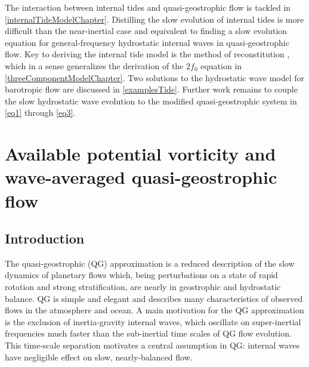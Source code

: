 \documentclass[12pt, oneside]{book}
\begin{document}
The interaction between internal tides and quasi-geostrophic flow is tackled in \ch \ref{internalTideModelChapter}.  Distilling the slow evolution of internal tides is more difficult than the near-inertial case and equivalent to finding a slow evolution equation for general-frequency hydrostatic internal waves in quasi-geostrophic flow.  Key to deriving the internal tide model is the method of reconstitution \citep{roberts1985introduction}, which in a sense generalizes the derivation of the $2f_0$ equation in \ch \ref{threeComponentModelChapter}.  Two solutions to the hydrostatic wave model for barotropic flow are discussed in \ch \ref{examplesTide}.  Further work remains to couple the slow hydrostatic wave evolution to the modified quasi-geostrophic system in \eqref{eq1} through \eqref{eq3}.



\let\cleardoublepage\relax\clearpage
\chapter{Available potential vorticity and wave-averaged quasi-geostrophic flow}
\label{APVchapter}
\thispagestyle{preliminary}

\section{Introduction}

The quasi-geostrophic (QG) approximation is a reduced description of the slow dynamics of planetary flows which, being perturbations on a state of rapid rotation and strong stratification, are nearly in geostrophic and hydrostatic balance.  QG is simple and elegant and describes many characteristics of observed flows in the atmosphere and ocean.  A main motivation for the QG approximation is the exclusion of inertia-gravity internal waves, which oscillate on super-inertial frequencies much faster than the sub-inertial time scales of QG flow evolution.  This time-scale separation motivates a central assumption in QG: internal waves have negligible effect on slow, nearly-balanced flow.  
\end{document}
